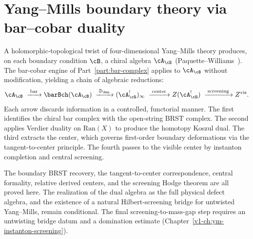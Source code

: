 \chapter{Yang--Mills boundary theory via bar--cobar duality}
\label{v1-ch:ym-boundary-theory}


A holomorphic-topological twist of four-dimensional Yang--Mills theory
produces, on each boundary condition $\cB$, a chiral algebra
$\cA_{\cB}$ (Paquette--Williams~\cite{PW22}). The bar-cobar engine of
Part~\ref{part:bar-complex} applies to $\cA_{\cB}$ without modification, yielding a chain of
algebraic reductions:
\[
\cA_{\cB}
\;\xrightarrow{\;\text{bar}\;}
\barBch(\cA_{\cB})
\;\xrightarrow{\;\mathbb{D}_{\Ran}\;}
(\cA_{\cB}^!)_\infty
\;\xrightarrow{\;\text{center}\;}
Z(\cA_{\cB}^!)
\;\xrightarrow{\;\text{screening}\;}
Z^{\mathrm{vis}}.
\]
Each arrow discards information in a controlled, functorial manner.
The first identifies the chiral bar complex with the open-string BRST
complex. The second applies Verdier duality on $\mathrm{Ran}(X)$ to
produce the homotopy Koszul dual. The third extracts the center, which
governs first-order boundary deformations via the tangent-to-center
principle. The fourth passes to the visible center by instanton
completion and central screening.

\begin{remark}
\label{rem:ym-chain-status}
The boundary BRST recovery, the tangent-to-center correspondence,
central formality, relative derived centers, and the screening Hodge
theorem are all proved here. The realization of the dual algebra as
the full physical defect algebra, and the existence of a natural
Hilbert-screening bridge for untwisted Yang--Mills, remain conditional.
The final screening-to-mass-gap step requires an untwisting bridge datum
and a domination estimate (Chapter~\ref{v1-ch:ym-instanton-screening}).
\end{remark}

